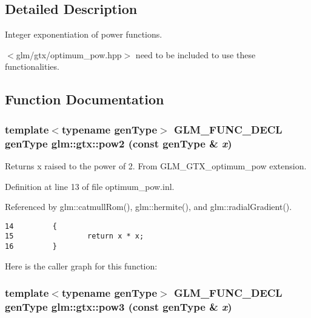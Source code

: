 \subsection{Detailed Description}
Integer exponentiation of power functions. 

$<$glm/gtx/optimum\_\-pow.hpp$>$ need to be included to use these functionalities. 

\subsection{Function Documentation}
\hypertarget{group__gtx__optimum__pow_g8c44a36cd695f8abc2444152606f6067}{
\subsubsection[pow2]{\setlength{\rightskip}{0pt plus 5cm}template$<$typename genType$>$ GLM\_\-FUNC\_\-DECL genType glm::gtx::pow2 (const genType \& {\em x})}}
\label{group__gtx__optimum__pow_g8c44a36cd695f8abc2444152606f6067}


Returns x raised to the power of 2. From GLM\_\-GTX\_\-optimum\_\-pow extension. 

Definition at line 13 of file optimum\_\-pow.inl.

Referenced by glm::catmullRom(), glm::hermite(), and glm::radialGradient().

\begin{Code}\begin{verbatim}14         {
15                 return x * x;
16         }
\end{verbatim}
\end{Code}




Here is the caller graph for this function:\hypertarget{group__gtx__optimum__pow_gc304ffcd456eeb248c1a3820cd9d7784}{
\subsubsection[pow3]{\setlength{\rightskip}{0pt plus 5cm}template$<$typename genType$>$ GLM\_\-FUNC\_\-DECL genType glm::gtx::pow3 (const genType \& {\em x})}}
\label{group__gtx__optimum__pow_gc304ffcd456eeb248c1a3820cd9d7784}


